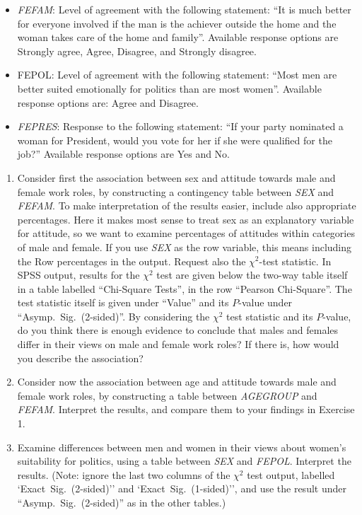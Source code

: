 \documentclass[11pt,a4paper,openany]{book}
\begin{document}
\begin{itemize}
\item
  \emph{FEFAM}: Level of agreement with the following statement: ``It is
  much better for everyone involved if the man is the achiever outside
  the home and the woman takes care of the home and family''. Available
  response options are Strongly agree, Agree, Disagree, and Strongly
  disagree.
\item
  FEPOL: Level of agreement with the following statement: ``Most men are
  better suited emotionally for politics than are most women''.
  Available response options are: Agree and Disagree.
\item
  \emph{FEPRES}: Response to the following statement: ``If your party
  nominated a woman for President, would you vote for her if she were
  qualified for the job?'' Available response options are Yes and No.
\end{itemize}

\begin{enumerate}
\def\labelenumi{\arabic{enumi}.}
\item
  Consider first the association between sex and attitude towards male
  and female work roles, by constructing a contingency table between
  \emph{SEX} and \emph{FEFAM}. To make interpretation of the results
  easier, include also appropriate percentages. Here it makes most sense
  to treat sex as an explanatory variable for attitude, so we want to
  examine percentages of attitudes within categories of male and female.
  If you use \emph{SEX} as the row variable, this means including the
  Row percentages in the output. Request also the \(\chi^{2}\)-test
  statistic. In SPSS output, results for the \(\chi^{2}\) test are given
  below the two-way table itself in a table labelled ``Chi-Square
  Tests'', in the row ``Pearson Chi-Square''. The test statistic itself
  is given under ``Value'' and its \(P\)-value under
  ``Asymp.~Sig.~(2-sided)''. By considering the \(\chi^{2}\) test
  statistic and its \(P\)-value, do you think there is enough evidence
  to conclude that males and females differ in their views on male and
  female work roles? If there is, how would you describe the
  association?
\item
  Consider now the association between age and attitude towards male and
  female work roles, by constructing a table between \emph{AGEGROUP} and
  \emph{FEFAM}. Interpret the results, and compare them to your findings
  in Exercise 1.
\item
  Examine differences between men and women in their views about women's
  suitability for politics, using a table between \emph{SEX} and
  \emph{FEPOL}. Interpret the results. (Note: ignore the last two
  columns of the \(\chi^{2}\) test output, labelled
  `Exact~Sig.~(2-sided)'' and `Exact~Sig.~(1-sided)'', and use the
  result under ``Asymp.~Sig.~(2-sided)'' as in the other tables.)
\end{enumerate}
\end{document}
